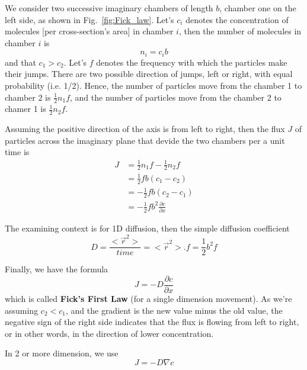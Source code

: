 We consider two successive imaginary chambers of length $b$, chamber
one on the left side, as shown in Fig.~\ref{fig:Fick_law}. Let's $c_i$
denotes the concentration of molecules [per cross-section's area] in
chamber $i$, then the number of molecules in chamber $i$ is
\begin{equation}
  \label{eq:71}
n_i = c_ib  
\end{equation}
and that $c_1 > c_2$. Let's $f$ denotes the frequency with which the
particles make their jumps. There are two possible direction of jumps,
left or right, with equal probability (i.e. 1/2). Hence, the number of
particles move from the chamber 1 to chamber 2 is $\frac{1}{2}n_1f$,
and the number of particles move from the chamber 2 to chamer 1 is
$\frac{1}{2}n_2f$. 

Assuming the positive direction of the axis is from left to right,
then the flux $J$ of particles across the imaginary plane that devide
the two chambers per a unit time is
\begin{equation}\begin{split}
    J &= \frac{1}{2}n_1f - \frac{1}{2}n_2f \\
   &= \frac{1}{2}fb \left (c_1 - c_2 \right) \\
   &= -\frac{1}{2}fb \left (c_2 - c_1 \right) \\
    &= -\frac{1}{2}fb^2 \frac{\partial c}{\partial x} 
  \end{split}
\end{equation}

The examining context is for 1D diffusion, then the simple
diffusion coefficient
\begin{equation}
  D =\frac{ <\overrightarrow r^2>}{time} = <\overrightarrow
  r^2>.f = \frac{1}{2}b^2f
\end{equation}

Finally, we have the formula 
\begin{equation}
  J= -D \frac{\partial c}{\partial x}
\end{equation}
which is called {\bf Fick's First Law} (for a single dimension
movement). As we're assuming $c_2 < c_1$, and the gradient is the new
value minus the old value, the negative sign of the right side
indicates that the flux is flowing from left to right, or in other
words, in the direction of lower concentration.

In 2 or more dimension, we use
\begin{equation}
J = -D \nabla c
\end{equation}

